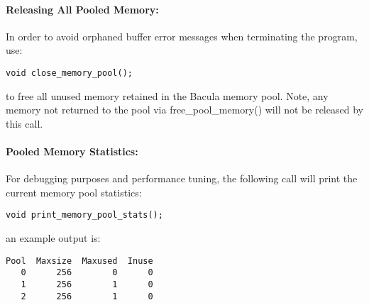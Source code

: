 \paragraph*{Releasing All Pooled Memory:}

In order to avoid orphaned buffer error messages when terminating the program,
use:

\footnotesize
\begin{verbatim}
void close_memory_pool();
\end{verbatim}
\normalsize

to free all unused memory retained in the Bacula memory pool. Note, any memory
not returned to the pool via free\_pool\_memory() will not be released by this
call.

\paragraph*{Pooled Memory Statistics:}

For debugging purposes and performance tuning, the following call will print
the current memory pool statistics:

\footnotesize
\begin{verbatim}
void print_memory_pool_stats();
\end{verbatim}
\normalsize

an example output is:

\footnotesize
\begin{verbatim}
Pool  Maxsize  Maxused  Inuse
   0      256        0      0
   1      256        1      0
   2      256        1      0
\end{verbatim}
\normalsize
